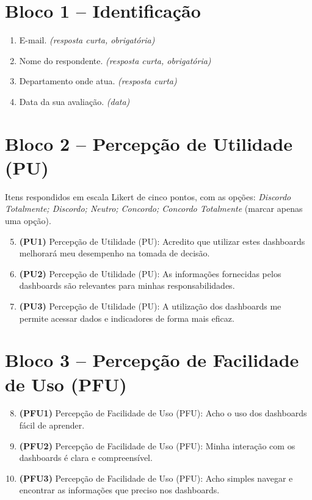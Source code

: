 \section*{Bloco 1 -- Identificação}

\begin{enumerate}
    \item E-mail. \textit{(resposta curta, obrigatória)}
    \item Nome do respondente. \textit{(resposta curta, obrigatória)}
    \item Departamento onde atua. \textit{(resposta curta)}
    \item Data da sua avaliação. \textit{(data)}
\end{enumerate}

\section*{Bloco 2 -- Percepção de Utilidade (PU)}

\noindent Itens respondidos em escala Likert de cinco pontos, com as opções: \textit{Discordo Totalmente; Discordo; Neutro; Concordo; Concordo Totalmente} (marcar apenas uma opção).

\begin{enumerate}
    \setcounter{enumi}{4}
    \item \textbf{(PU1)} Percepção de Utilidade (PU): Acredito que utilizar estes dashboards melhorará meu desempenho na tomada de decisão.
    \item \textbf{(PU2)} Percepção de Utilidade (PU): As informações fornecidas pelos dashboards são relevantes para minhas responsabilidades.
    \item \textbf{(PU3)} Percepção de Utilidade (PU): A utilização dos dashboards me permite acessar dados e indicadores de forma mais eficaz.
\end{enumerate}

\section*{Bloco 3 -- Percepção de Facilidade de Uso (PFU)}

\begin{enumerate}
    \setcounter{enumi}{7}
    \item \textbf{(PFU1)} Percepção de Facilidade de Uso (PFU): Acho o uso dos dashboards fácil de aprender.
    \item \textbf{(PFU2)} Percepção de Facilidade de Uso (PFU): Minha interação com os dashboards é clara e compreensível.
    \item \textbf{(PFU3)} Percepção de Facilidade de Uso (PFU): Acho simples navegar e encontrar as informações que preciso nos dashboards.
\end{enumerate}


